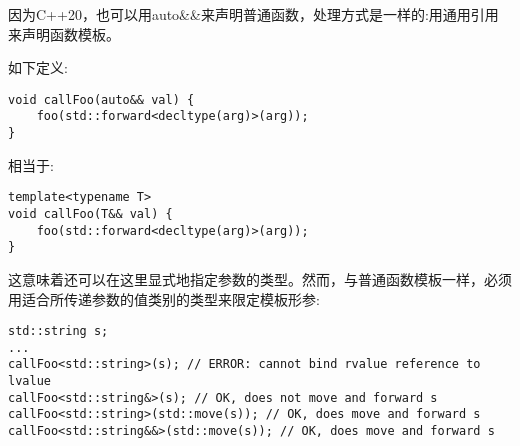 因为C++20，也可以用auto\&\&来声明普通函数，处理方式是一样的:用通用引用来声明函数模板。\par

如下定义:\par

\begin{lstlisting}[caption={}]
void callFoo(auto&& val) {
	foo(std::forward<decltype(arg)>(arg));
}
\end{lstlisting}

相当于:\par

\begin{lstlisting}[caption={}]
template<typename T>
void callFoo(T&& val) {
	foo(std::forward<decltype(arg)>(arg));
}
\end{lstlisting}

这意味着还可以在这里显式地指定参数的类型。然而，与普通函数模板一样，必须用适合所传递参数的值类别的类型来限定模板形参:\par

\begin{lstlisting}[caption={}]
std::string s;
...
callFoo<std::string>(s); // ERROR: cannot bind rvalue reference to lvalue
callFoo<std::string&>(s); // OK, does not move and forward s
callFoo<std::string>(std::move(s)); // OK, does move and forward s
callFoo<std::string&&>(std::move(s)); // OK, does move and forward s
\end{lstlisting}







































